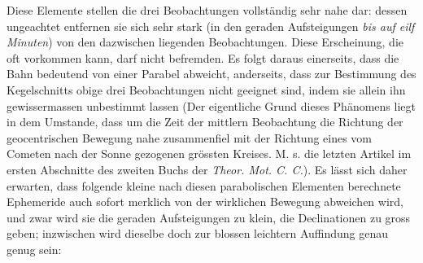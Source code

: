 \par\indent Diese Elemente stellen die drei Beobachtungen vollständig sehr nahe dar: dessen ungeachtet
entfernen sie sich sehr stark (in den geraden Aufsteigungen \emph{bis auf eilf Minuten}) von den
dazwischen liegenden Beobachtungen. Diese Erscheinung, die oft vorkommen kann, darf nicht
befremden. Es folgt daraus einerseits, dass die Bahn bedeutend von einer Parabel abweicht,
anderseits, dass zur Bestimmung des Kegelschnitts obige drei Beobachtungen nicht geeignet sind,
indem sie allein ihn gewissermassen unbestimmt lassen (Der eigentliche Grund dieses Phänomens
liegt in dem Umstande, dass um die Zeit der mittlern Beobachtung die Richtung der geocentrischen
Bewegung nahe zusammenfiel mit der Richtung eines vom Cometen nach der Sonne gezogenen grössten
Kreises. M. s. die letzten Artikel im ersten Abschnitte des zweiten Buchs der \emph{Theor. Mot.
C. C.}). Es lässt sich daher erwarten, dass folgende kleine nach diesen parabolischen Elementen
berechnete Ephemeride auch sofort merklich von der wirklichen Bewegung abweichen wird, und zwar
wird sie die geraden Aufsteigungen zu klein, die Declinationen zu gross geben; inzwischen wird
dieselbe doch zur blossen leichtern Auffindung genau genug sein:

